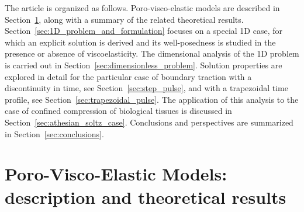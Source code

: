 \documentclass[12pt,a4paper]{amsart}
\theoremstyle{definition}
\begin{document}
The article is organized as follows. Poro-visco-elastic models are described in Section~\ref{sec:model}, along with a summary of the related theoretical results. Section~\ref{sec:1D_problem_and_formulation}
focuses on a special 1D case, for which an explicit solution is derived and its well-posedness is studied in
the presence or absence of viscoelasticity. The dimensional analysis of the 1D problem is carried out in Section~\ref{sec:dimensionless_problem}. Solution properties are explored in detail for the particular case of boundary traction with a discontinuity in time, see Section~\ref{sec:step_pulse}, and with a trapezoidal time profile, see Section~\ref{sec:trapezoidal_pulse}. The application of this analysis to the case of confined compression of biological tissues is discussed in Section~\ref{sec:athesian_soltz_case}. Conclusions and perspectives are summarized in Section~\ref{sec:conclusions}.

\section{Poro-Visco-Elastic Models: description and theoretical results}
\label{sec:model}
\end{document}
